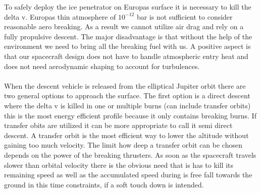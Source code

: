 \label{sec:Descent_Profile}
To safely deploy the ice penetrator on Europas surface it is necessary to kill the delta v. Europas thin atmosphere of $10^{-{12}}$ bar is not sufficient to consider reasonable aero breaking. As a result we cannot utilize air drag and rely on a fully propulsive descent. The major disadvantage is that without the help of the environment we need to bring all the breaking fuel with us. A positive aspect is that our spacecraft design does not have to handle atmospheric entry heat and does not need aerodynamic shaping to account for turbulences.\\
\\
When the descent vehicle is released from the elliptical Jupiter orbit there are two general options to approach the surface. The first option is a direct descent where the delta v is killed in one or multiple burns (can include transfer orbits)  this is the most energy efficient profile because it only contains breaking burns. If transfer obits are utilized it can be more appropriate to call it semi direct descent. A transfer orbit is the most efficient way to lower the altitude without gaining too much velocity. The limit how deep a transfer orbit can be chosen depends on the power of the breaking thrusters. As soon as the spacecraft travels slower than orbital velocity there is the obvious need that is has to kill its remaining speed as well as the accumulated speed during is free fall towards the ground in this time constraints, if a soft touch down is intended. \\
